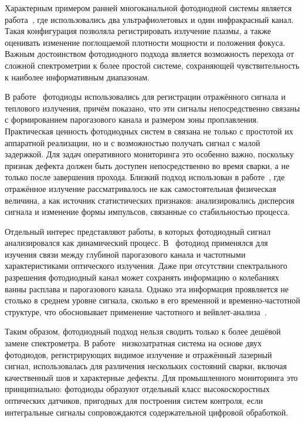 Характерным примером ранней многоканальной фотодиодной системы является работа~\cite{park2001fuzzy}, где использовались два ультрафиолетовых и один инфракрасный канал. Такая конфигурация позволяла регистрировать излучение плазмы, а также оценивать изменение поглощаемой плотности мощности и положения фокуса. Важным достоинством фотодиодного подхода является возможность перехода от сложной спектрометрии к более простой системе, сохраняющей чувствительность к наиболее информативным диапазонам.

В работе~\cite{kawahito2004process} фотодиоды использовались для регистрации отражённого сигнала и теплового излучения, причём показано, что эти сигналы непосредственно связаны с формированием парогазового канала и размером зоны проплавления. Практическая ценность фотодиодных систем в связана не только с простотой их аппаратной реализации, но и с возможностью получать сигнал с малой задержкой. Для задач оперативного мониторинга это особенно важно, поскольку признак дефекта должен быть доступен непосредственно во время сварки, а не только после завершения прохода. Близкий подход использован в работе~\cite{olsson2011advances}, где отражённое излучение рассматривалось не как самостоятельная физическая величина, а как источник статистических признаков: анализировались дисперсия сигнала и изменение формы импульсов, связанные со стабильностью процесса.

Отдельный интерес представляют работы, в которых фотодиодный сигнал анализировался как динамический процесс. В~\cite{mrvna2013correlation} фотодиод применялся для изучения связи между глубиной парогазового канала и частотными характеристиками оптического излучения. Даже при отсутствии спектрального разрешения фотодиодный канал может сохранять информацию о колебаниях ванны расплава и парогазового канала. Однако эта информация проявляется не столько в среднем уровне сигнала, сколько в его временной и временно-частотной структуре, что обосновывает применение частотного и вейвлет-анализа~\cite{vakili2017wavelet,fang2004wavelet}.

Таким образом, фотодиодный подход нельзя сводить только к более дешёвой замене спектрометра. В работе~\cite{zhang2019low} низкозатратная система на основе двух фотодиодов, регистрирующих видимое излучение и отражённый лазерный сигнал, использовалась для различения нескольких состояний сварки, включая качественный шов и характерные дефекты. Для промышленного мониторинга это принципиально: фотодиоды образуют отдельный класс высокоскоростных оптических датчиков, пригодных для построения систем контроля, если интегральные сигналы сопровождаются содержательной цифровой обработкой.


